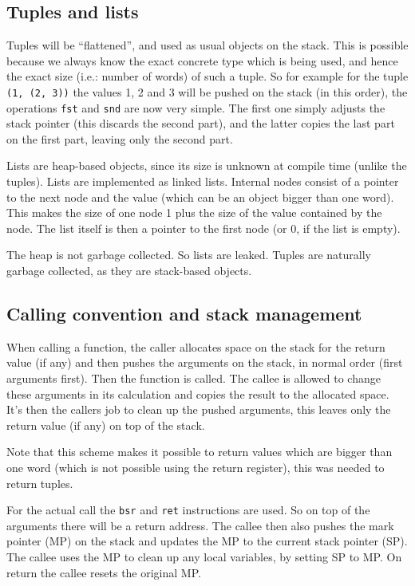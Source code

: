 \documentclass[11pt]{amsart}
\begin{document}
\subsection{Tuples and lists}
Tuples will be ``flattened'', and used as usual objects on the stack. This is possible because we always know the exact concrete type which is being used, and hence the exact size (i.e.: number of words) of such a tuple. So for example for the tuple \texttt{(1, (2, 3))} the values 1, 2 and 3 will be pushed on the stack (in this order), the operations \texttt{fst} and \texttt{snd} are now very simple. The first one simply adjusts the stack pointer (this discards the second part), and the latter copies the last part on the first part, leaving only the second part.

Lists are heap-based objects, since its size is unknown at compile time (unlike the tuples). Lists are implemented as linked lists. Internal nodes consist of a pointer to the next node and the value (which can be an object bigger than one word). This makes the size of one node 1 plus the size of the value contained by the node. The list itself is then a pointer to the first node (or 0, if the list is empty).

The heap is not garbage collected. So lists are leaked. Tuples are naturally garbage collected, as they are stack-based objects.

\subsection{Calling convention and stack management}
When calling a function, the caller allocates space on the stack for the return value (if any) and then pushes the arguments on the stack, in normal order (first arguments first). Then the function is called. The callee is allowed to change these arguments in its calculation and copies the result to the allocated space. It's then the callers job to clean up the pushed arguments, this leaves only the return value (if any) on top of the stack.

Note that this scheme makes it possible to return values which are bigger than one word (which is not possible using the return register), this was needed to return tuples.

For the actual call the \texttt{bsr} and \texttt{ret} instructions are used. So on top of the arguments there will be a return address. The callee then also pushes the mark pointer (MP) on the stack and updates the MP to the current stack pointer (SP). The callee uses the MP to clean up any local variables, by setting SP to MP. On return the callee resets the original MP.
\end{document}

